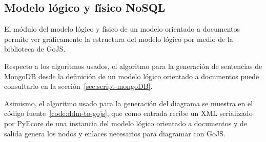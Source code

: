 \subsection{Modelo lógico y físico NoSQL}

El módulo del modelo lógico y físico de un modelo orientado a documentos permite ver gráficamente la estructura del modelo lógico por medio de la biblioteca de GoJS.

Respecto a los algoritmos usados, el algoritmo para la generación de sentencias de MongoDB desde la definición de un modelo lógico orientado a documentos puede consultarlo en la sección~\ref{sec:script-mongoDB}.


Asimismo, el algoritmo usado para la generación del diagrama se muestra en el código fuente~\ref{code:ddm-to-gojs}, que como entrada recibe un XML serializado por PyEcore de una instancia del modelo lógico orientado a documentos y de salida genera los nodos y enlaces necesarios para diagramar con GoJS.

